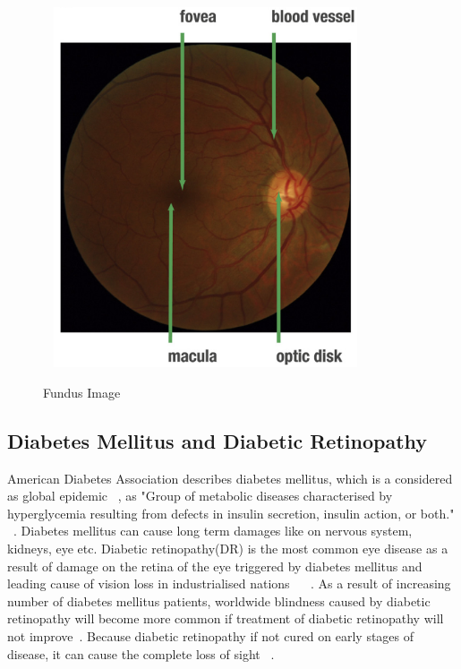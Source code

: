 \begin{figure}[t]
\caption{Fundus Image}~\cite{mookiah2015application}
\label{fundusPhotoRetina}
\centering
\includegraphics[width=0.8\textwidth]{Figures/fundus_photography_anatomical}
\end{figure}


\subsection{Diabetes Mellitus and Diabetic Retinopathy}
American Diabetes Association describes diabetes mellitus, which is a considered as global epidemic ~\cite{falt2012modern}, as "Group of metabolic diseases characterised by hyperglycemia resulting from defects in insulin secretion, insulin action, or both." ~\cite{national1979classification}. Diabetes mellitus can cause long term damages like on nervous system, kidneys, eye etc. Diabetic retinopathy(DR) is the most common eye disease as a result of damage on the retina of the eye triggered by diabetes mellitus and leading cause of vision loss in industrialised nations ~\cite{antal2014ensemble} ~\cite{stitt2013advances}. As a result of increasing number of diabetes mellitus patients, worldwide blindness caused by diabetic retinopathy will become more common if treatment of diabetic retinopathy will not improve~\cite{wilkinson2003proposed}. Because diabetic retinopathy if not cured on early stages of disease, it can cause the complete loss of sight ~\cite{rocha2011points}. 

